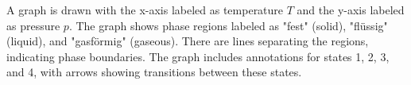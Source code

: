 A graph is drawn with the x-axis labeled as temperature \( T \) and the y-axis labeled as pressure \( p \). The graph shows phase regions labeled as "fest" (solid), "flüssig" (liquid), and "gasförmig" (gaseous). There are lines separating the regions, indicating phase boundaries. The graph includes annotations for states 1, 2, 3, and 4, with arrows showing transitions between these states.